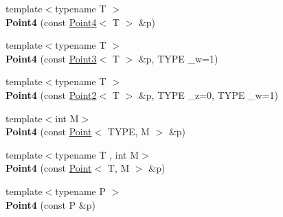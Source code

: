 \begin{Indent}
\begin{DoxyCompactItemize}
{\footnotesize template$<$typename T $>$ }\\{\bfseries Point4} (const \mbox{\hyperlink{classcy_1_1_point4}{Point4}}$<$ T $>$ \&p)
\item 
\mbox{\label{classcy_1_1_point4_abf9952c10cdba39d7463495ccf622141}} 
{\footnotesize template$<$typename T $>$ }\\{\bfseries Point4} (const \mbox{\hyperlink{classcy_1_1_point3}{Point3}}$<$ T $>$ \&p, T\+Y\+PE \+\_\+w=1)
\item 
\mbox{\label{classcy_1_1_point4_a706923bb60f52176280e5e7effdae89d}} 
{\footnotesize template$<$typename T $>$ }\\{\bfseries Point4} (const \mbox{\hyperlink{classcy_1_1_point2}{Point2}}$<$ T $>$ \&p, T\+Y\+PE \+\_\+z=0, T\+Y\+PE \+\_\+w=1)
\item 
\mbox{\label{classcy_1_1_point4_a198409f7316c075a3278dd1669b40d93}} 
{\footnotesize template$<$int M$>$ }\\{\bfseries Point4} (const \mbox{\hyperlink{classcy_1_1_point}{Point}}$<$ T\+Y\+PE, M $>$ \&p)
\item 
\mbox{\label{classcy_1_1_point4_a117650f2c8bd5e585bf5940c0f730623}} 
{\footnotesize template$<$typename T , int M$>$ }\\{\bfseries Point4} (const \mbox{\hyperlink{classcy_1_1_point}{Point}}$<$ T, M $>$ \&p)
\item 
\mbox{\label{classcy_1_1_point4_a50f5d2d040ca94df38bc7c44f42bc7e8}} 
{\footnotesize template$<$typename P $>$ }\\{\bfseries Point4} (const P \&p)
\end{DoxyCompactItemize}
\end{Indent}
